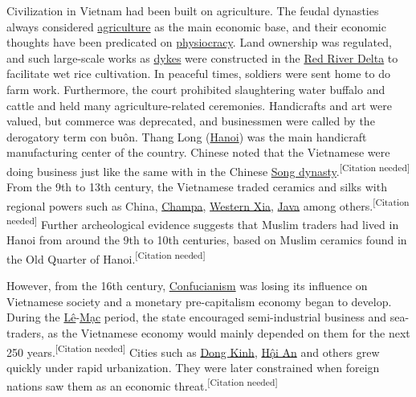 \documentclass{article}
\begin{document}
Civilization in Vietnam had been built on agriculture. The feudal dynasties always considered \href{https://en.wikipedia.org/wiki/Agriculture}{agriculture} as the main economic base, and their economic thoughts have been predicated on \href{https://en.wikipedia.org/wiki/Physiocracy}{physiocracy}. Land ownership was regulated, and such large-scale works as \href{https://en.wikipedia.org/wiki/Dike_(construction)}{dykes} were constructed in the \href{https://en.wikipedia.org/wiki/Red_River_Delta}{Red River Delta} to facilitate wet rice cultivation. In peaceful times, soldiers were sent home to do farm work. Furthermore, the court prohibited slaughtering water buffalo and cattle and held many agriculture-related ceremonies. Handicrafts and art were valued, but commerce was deprecated, and businessmen were called by the derogatory term con buôn. Thang Long (\href{https://en.wikipedia.org/wiki/Hanoi}{Hanoi}) was the main handicraft manufacturing center of the country. Chinese noted that the Vietnamese were doing business just like the same with in the Chinese \href{https://en.wikipedia.org/wiki/Song_dynasty}{Song dynasty}.\textsuperscript{[Citation needed]} From the 9th to 13th century, the Vietnamese traded ceramics and silks with regional powers such as China, \href{https://en.wikipedia.org/wiki/Champa}{Champa}, \href{https://en.wikipedia.org/wiki/Western_Xia}{Western Xia}, \href{https://en.wikipedia.org/wiki/Java}{Java} among others.\textsuperscript{[Citation needed]} Further archeological evidence suggests that Muslim traders had lived in Hanoi from around the 9th to 10th centuries, based on Muslim ceramics found in the Old Quarter of Hanoi.\textsuperscript{[Citation needed]}

However, from the 16th century, \href{https://en.wikipedia.org/wiki/Confucianism}{Confucianism} was losing its influence on Vietnamese society and a monetary pre-capitalism economy began to develop. During the \href{https://en.wikipedia.org/wiki/L%C3%AA_dynasty}{Lê}-\href{https://en.wikipedia.org/wiki/M%E1%BA%A1c_dynasty}{Mạc} period, the state encouraged semi-industrial business and sea-traders, as the Vietnamese economy would mainly depended on them for the next 250 years.\textsuperscript{[Citation needed]} Cities such as \href{https://en.wikipedia.org/wiki/Dong_Kinh}{Dong Kinh}, \href{https://en.wikipedia.org/wiki/H%E1%BB%99i_An}{Hội An} and others grew quickly under rapid urbanization. They were later constrained when foreign nations saw them as an economic threat.\textsuperscript{[Citation needed]}
\end{document}
